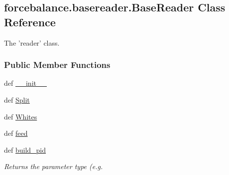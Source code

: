 \hypertarget{classforcebalance_1_1basereader_1_1BaseReader}{\subsection{forcebalance.\-basereader.\-Base\-Reader \-Class \-Reference}
\label{classforcebalance_1_1basereader_1_1BaseReader}
}


\-The 'reader' class.  


\subsubsection*{\-Public \-Member \-Functions}
\begin{DoxyCompactItemize}
\item 
def \hyperlink{classforcebalance_1_1basereader_1_1BaseReader_ae547018f39a9b0c187163c6377df4ef7}{\-\_\-\-\_\-init\-\_\-\-\_\-}
\item 
def \hyperlink{classforcebalance_1_1basereader_1_1BaseReader_ae0ea53a7d942ceb93bdc34499f694639}{\-Split}
\item 
def \hyperlink{classforcebalance_1_1basereader_1_1BaseReader_a2819ab1e523b6ff8e7467e56e3582386}{\-Whites}
\item 
def \hyperlink{classforcebalance_1_1basereader_1_1BaseReader_ad345848c6683d9ba66eed0d2b0197fb6}{feed}
\item 
def \hyperlink{classforcebalance_1_1basereader_1_1BaseReader_a208a252b78a079e81a4a0b5320f3d564}{build\-\_\-pid}
\begin{DoxyCompactList}\small\item\em \-Returns the parameter type (e.\-g. \end{DoxyCompactList}\end{DoxyCompactItemize}
